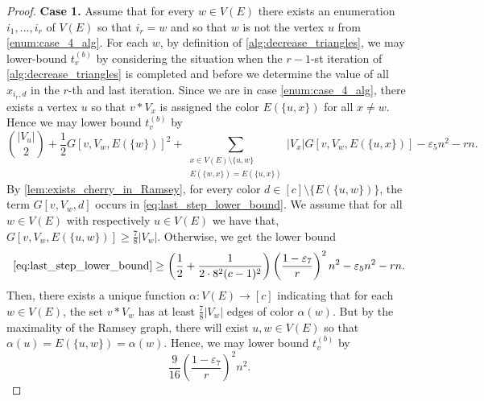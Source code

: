 \documentclass[a4paper,11pt]{article}
\numberwithin{equation}{section}
\begin{document}
\begin{proof}
    \medskip
    \noindent \textbf{Case 1. }     Assume that for every $w\in V(E)$ there exists an enumeration $i_1,\dots,i_r$ of $V(E)$ so that 
    $i_r=w$ and so that 
    $w$ is not the vertex $u$ from \cref{enum:case_4_alg}. 
For each $w$, by definition of \cref{alg:decrease_triangles},
we may lower-bound $t_v^{(b)}$ by considering the situation when the $r-1$-st iteration of \cref{alg:decrease_triangles} is completed and before we determine the value of all $x_{i_r,d}$ in the $r$-th and last iteration. Since we are in case \cref{enum:case_4_alg}, there exists a vertex $u$ so that
$v\ast V_x$ is assigned the color $E(\{ u,x\})$ for all $x\ne w$. Hence we may lower bound $t_v^{(b)}$ by
\begin{equation}\label{eq:last_step_lower_bound}
    \binom{|V_u|}{2} + \frac{1}{2} G[v,V_w,E(\{w\})]^2 + \sum_{\substack{x\in V(E)\setminus\{u,w\} \\ E(\{w,x\}) = E(\{u,x\})}}|V_x| G[v,V_w,E(\{u,x\})] -\varepsilon_5n^2-rn.
\end{equation}
By \cref{lem:exists_cherry_in_Ramsey}, for every color $d\in [c]\setminus \{E(\{u,w\})\}$, the term $G[v,V_w,d]$ occurs in \cref{eq:last_step_lower_bound}. 
We assume that for all $w\in V(E)$ with respectively $u\in V(E)$ we have that, $G[v,V_w,E(\{u,w\})]\ge \frac{7}{8} |V_w|$. Otherwise, we get the lower bound
\begin{equation} \label{eq:tvbLower_4}
    \text{\cref{eq:last_step_lower_bound}} \ge 
    \left(\frac{1}{2} + \frac{1}{2\cdot 8^2(c-1)^2}\right)\left(\frac{1-\varepsilon_7}{r}\right)^2n^2 
    -\varepsilon_5 n^2 -rn.
\end{equation}
Then, there exists a unique function
$\alpha:V(E)\to[c]$ indicating that for each $w\in V(E)$, the set $v\ast V_w$ has at least $\frac{7}{8}|V_w|$ edges of color $\alpha(w)$. But by the maximality of the Ramsey graph, there will exist $u,w\in V(E)$ so that $\alpha(u)=E(\{u,w\}) = \alpha(w)$. Hence, we may lower bound $t_v^{(b)}$ by
%
\begin{equation} \label{eq:tvbLower_5}
    \frac{9}{16} \left(\frac{1-\varepsilon_7}{r}\right)^2n^2.
\end{equation}
%




\end{proof}
\end{document}
